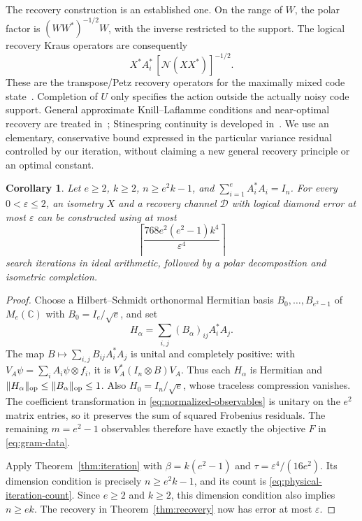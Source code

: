 \documentclass[11pt]{article}
\newcommand{\C}{\mathbb C}
\newtheorem{corollary}[theorem]{Corollary}
\theoremstyle{remark}
\numberwithin{equation}{section}
\begin{document}
The recovery construction is an established one. On the range of $W$,
the polar factor is $(WW^*)^{-1/2}W$, with the inverse restricted to
the support. The logical recovery Kraus operators are consequently
\[
 X^*A_i^*\,[\mathcal N(XX^*)]^{-1/2}.
\]
These are the transpose/Petz recovery operators for the maximally mixed
code state~\cite[Eq.~(4)]{NgMandayam}. Completion of $U$ only specifies
the action outside the actually noisy code support. General approximate
Knill--Laflamme conditions and near-optimal recovery are treated
in~\cite{BenyOreshkov}; Stinespring continuity is developed
in~\cite{KSW}. We use an elementary, conservative bound expressed in
the particular variance residual controlled by our iteration, without
claiming a new general recovery principle or an optimal constant.

\begin{corollary}\label{cor:constructive-channel}
Let $e\ge2$, $k\ge2$, $n\ge e^2k-1$, and
$\sum_{i=1}^e A_i^*A_i=I_n$. For every $0<\varepsilon\le2$, an
isometry $X$ and a recovery channel $\mathcal D$ with logical diamond
error at most $\varepsilon$ can be constructed using at most
\begin{equation}\label{eq:physical-iteration-count}
 \left\lceil\frac{768e^2(e^2-1)k^4}{\varepsilon^4}\right\rceil
\end{equation}
search iterations in ideal arithmetic, followed by a polar decomposition
and isometric completion.
\end{corollary}

\begin{proof}
Choose a Hilbert--Schmidt orthonormal Hermitian basis
$B_0,\ldots,B_{e^2-1}$ of $M_e(\C)$ with $B_0=I_e/\sqrt e$, and set
\begin{equation}\label{eq:normalized-observables}
 H_\alpha=\sum_{i,j}(B_\alpha)_{ij}A_i^*A_j.
\end{equation}
The map $B\mapsto\sum_{i,j}B_{ij}A_i^*A_j$ is unital and completely
positive: with $V_A\psi=\sum_i A_i\psi\otimes f_i$, it is
$V_A^*(I_n\otimes B)V_A$. Thus each $H_\alpha$ is Hermitian and
$\|H_\alpha\|_{\rm op}\le\|B_\alpha\|_{\rm op}\le1$.
Also $H_0=I_n/\sqrt e$, whose traceless compression vanishes.
The coefficient transformation in \eqref{eq:normalized-observables}
is unitary on the $e^2$ matrix entries, so it preserves the sum of
squared Frobenius residuals. The remaining $m=e^2-1$ observables
therefore have exactly the objective $F$ in \eqref{eq:gram-data}.

Apply Theorem~\ref{thm:iteration} with
$\beta=k(e^2-1)$ and $\tau=\varepsilon^4/(16e^2)$.
Its dimension condition is precisely $n\ge e^2k-1$, and its count
is \eqref{eq:physical-iteration-count}. Since $e\ge2$ and $k\ge2$,
this dimension condition also implies $n\ge ek$. The recovery in
Theorem~\ref{thm:recovery} now has error at most $\varepsilon$.
\end{proof}
\end{document}
